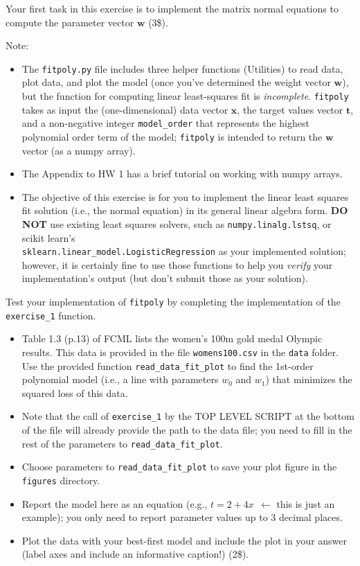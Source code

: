 \documentclass[10pt]{article}
\begin{document}
\begin{itemize}
Your first task in this exercise is to implement the matrix normal equations to compute the parameter vector $\mathbf{w}$ (3\$).

Note:
\begin{itemize}
\item The {\tt fitpoly.py} file includes three helper functions (Utilities) to read data, plot data, and plot the model (once you've determined the weight vector $\mathbf{w}$), but the function for computing linear least-squares fit is {\em incomplete}.  {\tt fitpoly} takes as input the (one-dimensional) data vector $\mathbf{x}$, the target values vector $\mathbf{t}$, and a non-negative integer {\tt model\_order} that represents the highest polynomial order term of the model; {\tt fitpoly} is intended to return the $\mathbf{w}$ vector (as a numpy array).

\item The Appendix to HW 1 has a brief tutorial on working with numpy arrays.

\item The objective of this exercise is for you to implement the linear least squares fit solution (i.e., the normal equation) in its general linear algebra form.  {\bf DO NOT} use existing least squares solvers, such as {\tt numpy.linalg.lstsq}, or scikit learn's \\{\tt sklearn.linear\_model.LogisticRegression} as your implemented solution; however, it is certainly fine to use those functions to help you {\em verify} your implementation's output (but don't submit those as your solution).
\end{itemize}

Test your implementation of {\tt fitpoly} by completing the implementation of the {\tt exercise\_1} function.
\begin{itemize}
\item Table 1.3 (p.13) of FCML lists the women's 100m gold medal Olympic results. This data is provided in the file {\tt womens100.csv} in the {\tt data} folder. Use the provided function {\tt read\_data\_fit\_plot} to find the 1st-order polynomial model (i.e., a line with parameters $w_0$ and $w_1$) that minimizes the squared loss of this data.
\item Note that the call of {\tt exercise\_1} by the TOP LEVEL SCRIPT at the bottom of the file will already provide the path to the data file; you need to fill in the rest of the parameters to {\tt read\_data\_fit\_plot}.
\item Choose parameters to {\tt read\_data\_fit\_plot} to save your plot figure in the {\tt figures} directory.
\item Report the model here as an equation (e.g., $t = 2 + 4x ~~\leftarrow$ this is just an example); you only need to report parameter values up to 3 decimal places.
\item Plot the data with your best-first model and include the plot in your answer (label axes and include an informative caption!) (2\$).
\end{itemize}



\end{itemize}
\end{document}
